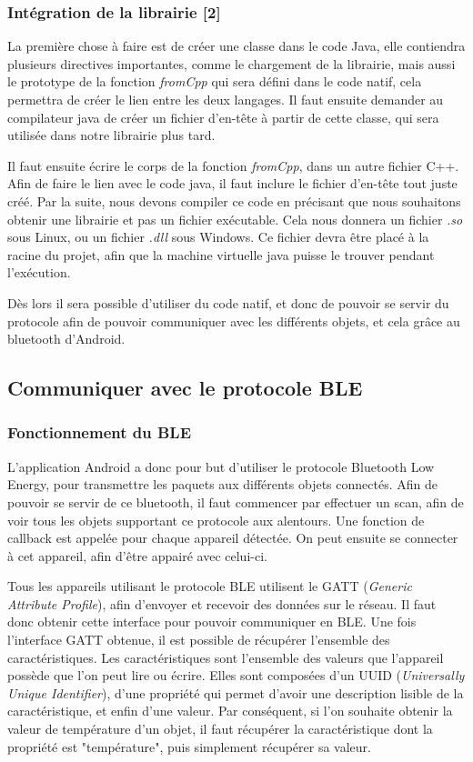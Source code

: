 \subsubsection{Intégration de la librairie [2]}
La première chose à faire est de créer une classe dans le code Java, elle contiendra plusieurs directives 
importantes, comme le chargement de la librairie, mais aussi le prototype de la fonction \emph{fromCpp} qui 
sera défini dans le code natif, cela permettra de créer le lien entre les deux langages. Il faut ensuite 
demander au compilateur java de créer un fichier d'en-tête à partir de cette classe, qui sera utilisée dans 
notre librairie plus tard.

Il faut ensuite écrire le corps de la fonction \emph{fromCpp}, dans un autre fichier C++. Afin de faire le 
lien avec le code java, il faut inclure le fichier d'en-tête tout juste créé. Par la suite, nous devons 
compiler ce code en précisant que nous souhaitons obtenir une librairie et pas un fichier exécutable. Cela 
nous donnera un fichier \emph{.so} sous Linux, ou un fichier \emph{.dll} sous Windows. Ce fichier devra 
être placé à la racine du projet, afin que la machine virtuelle java puisse le trouver pendant l'exécution.

Dès lors il sera possible d'utiliser du code natif, et donc de pouvoir se servir du protocole afin 
de pouvoir communiquer avec les différents objets, et cela grâce au bluetooth d'Android.


	\subsection{Communiquer avec le protocole BLE}
	  \subsubsection{Fonctionnement du BLE}
L'application Android a donc pour but d'utiliser le protocole Bluetooth Low Energy, pour transmettre les 
paquets aux différents objets connectés. Afin de pouvoir se servir de ce bluetooth, il faut commencer par 
effectuer un scan, afin de voir tous les objets supportant ce protocole aux alentours. Une fonction de 
callback est appelée pour chaque appareil détectée. On peut ensuite se connecter à cet appareil, afin d'être appairé avec celui-ci.

Tous les appareils utilisant le protocole BLE utilisent le GATT (\emph{Generic Attribute Profile}), afin 
d'envoyer et recevoir des données sur le réseau. Il faut donc obtenir cette interface pour pouvoir 
communiquer en BLE. Une fois l'interface GATT obtenue, il est possible de récupérer l'ensemble des 
caractéristiques. Les caractéristiques sont l'ensemble des valeurs que l'appareil possède que l'on peut lire 
ou écrire. Elles sont composées d'un UUID (\emph{Universally Unique Identifier}), d'une propriété qui permet 
d'avoir une description lisible de la caractéristique, et enfin d'une valeur. Par conséquent, si l'on souhaite 
obtenir la valeur de température d'un objet, il faut récupérer la caractéristique dont la propriété est 
"température", puis simplement récupérer sa valeur.

